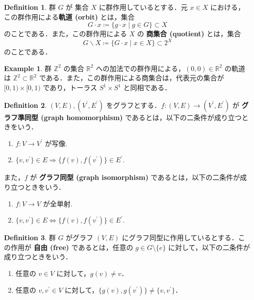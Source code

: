 \documentclass[dvipdfmx]{ujarticle}
\theoremstyle{definition}
\newtheorem{dfn}{Definition}[section]
\newtheorem*{ex*}{Example}
\begin{document}
\begin{dfn}\label{orbit_quotient}
 群 $G$ が 集合 $X$ に群作用しているとする．元 $x\in X$ における，この群作用による\textbf{軌道 (orbit)} とは，集合
 $$G\cdot x\coloneqq\{g\cdot x\mid g\in G\}\subset X$$
 のことである．また，この群作用による $X$ の \textbf{商集合 (quotient)} とは，集合
 $$G\backslash X\coloneqq\{G\cdot x\mid x\in X\}\subset 2^X$$
 のことである．
\end{dfn}

\begin{ex*}
  群 $\mathbb{Z}^2$ の集合 $\mathbb{R}^2$ への加法での群作用による，$(0,0)\in\mathbb{R}^2$ の軌道は $\mathbb{Z}^2\subset\mathbb{R}^2$ である．また，この群作用による商集合は，代表元の集合が $[0,1)\times[0,1)$ であり，トーラス $S^1\times S^1$ と同相である．
\end{ex*}

\begin{dfn}
  $(V,E),(V^\prime,E^\prime)$ をグラフとする．$f\colon (V,E)\rightarrow(V^\prime,E^\prime)$ が \textbf{グラフ準同型 (graph homomorphism)} であるとは，以下の二条件が成り立つときをいう．
  \begin{enumerate}
    \item $f\colon V\rightarrow V^\prime$ が写像.
    \item $\{v,v^\prime\}\in E\Rightarrow \{f(v),f(v^\prime)\}\in E^\prime.$   
  \end{enumerate}
  また，$f$ が \textbf{グラフ同型 (graph isomorphism)} であるとは，以下の二条件が成り立つときをいう．
  \begin{enumerate}
    \item $f\colon V\rightarrow V$ が全単射.
    \item $\{v,v^\prime\}\in E\Leftrightarrow \{f(v),f(v^\prime)\}\in E^\prime.$   
  \end{enumerate}
  
\end{dfn}

\begin{dfn}
  群 $G$ がグラフ $(V,E)$ にグラフ同型に作用しているとする．この作用が \textbf{自由 (free)} であるとは，任意の $g\in G\setminus \{e\}$ に対して，以下の二条件が成り立つときをいう．
  \begin{enumerate}
   \item 任意の $v\in V$ に対して，$g(v)\neq v$．
   \item 任意の $v,v^\prime \in V$ に対して，$\{g(v),g(v^\prime)\}\neq\{v,v^\prime\}$．
  \end{enumerate}
\end{dfn}
\end{document}
